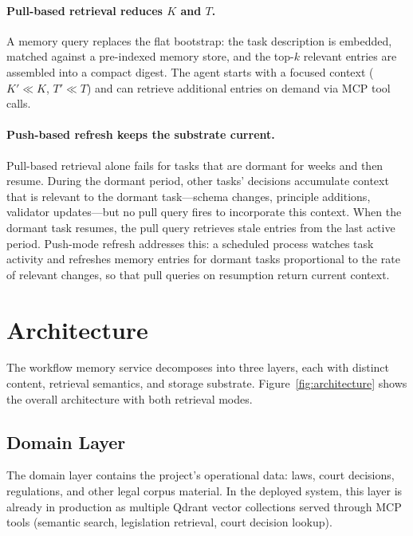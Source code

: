 \documentclass[11pt]{article}
\begin{document}
\paragraph{Pull-based retrieval reduces $K$ and $T$.}
A memory query replaces the flat bootstrap: the task description is embedded, matched against a pre-indexed memory store, and the top-$k$ relevant entries are assembled into a compact digest.
The agent starts with a focused context ($K' \ll K$, $T' \ll T$) and can retrieve additional entries on demand via MCP tool calls.

\paragraph{Push-based refresh keeps the substrate current.}
Pull-based retrieval alone fails for tasks that are dormant for weeks and then resume.
During the dormant period, other tasks' decisions accumulate context that is relevant to the dormant task---schema changes, principle additions, validator updates---but no pull query fires to incorporate this context.
When the dormant task resumes, the pull query retrieves stale entries from the last active period.
Push-mode refresh addresses this: a scheduled process watches task activity and refreshes memory entries for dormant tasks proportional to the rate of relevant changes, so that pull queries on resumption return current context.


\section{Architecture}
\label{sec:architecture}

The workflow memory service decomposes into three layers, each with distinct content, retrieval semantics, and storage substrate.
Figure~\ref{fig:architecture} shows the overall architecture with both retrieval modes.



\subsection{Domain Layer}
\label{sec:domain-layer}

The domain layer contains the project's operational data: laws, court decisions, regulations, and other legal corpus material.
In the deployed system, this layer is already in production as multiple Qdrant vector collections served through MCP tools (semantic search, legislation retrieval, court decision lookup).
\end{document}
